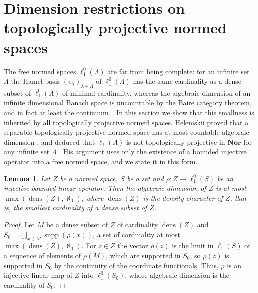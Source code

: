 \documentclass[12pt]{article}
\newtheorem{lemma}[theorem]{Lemma}
\newcommand{\Nor}{\mathbf{Nor}}
\newcommand{\lo}[1]{\ell_1^0(#1)}
\newcommand{\ellone}[1]{\ell_1(#1)}
\newcommand{\supp}{\operatorname{supp}}
\begin{document}

\section{Dimension restrictions on topologically projective normed
  spaces}\label{SectionNecessaryConditions}

The free normed spaces $\lo{\Lambda}$ are far from being complete: for an
infinite set $\Lambda$ the Hamel basis ${(e_\lambda)}_{\lambda\in\Lambda}$ of
$\lo{\Lambda}$ has the same cardinality as a dense subset of $\lo{\Lambda}$
of minimal cardinality, whereas the algebraic dimension of an infinite
dimensional Banach space is uncountable by the Baire category theorem, and in
fact at least the continuum~\cite{LowigDimLinRaume}. In this section we show that
this smallness is inherited by all topologically projective normed spaces.
Helemskii proved that a separable topologically projective normed space has at
most countable algebraic dimension \cite[proposition 2.4]{HelExtrProjSeqAlg},
and deduced that $\ellone{\Lambda}$ is not topologically projective in $\Nor$
for any infinite set $\Lambda$ \cite[proposition 2.5]{HelExtrProjSeqAlg}. His
argument uses only the existence of a bounded injective operator into a free
normed space, and we state it in this form.

\begin{lemma}\label{InjectionDimension} Let $Z$ be a normed space, $S$ be a
    set and $\rho:Z\to\lo{S}$ be an injective bounded linear operator. Then
    the algebraic dimension of $Z$ is at most $\max(\operatorname{dens}(Z),\aleph_0)$,
    where $\operatorname{dens}(Z)$ is the density character of $Z$, that is,
    the smallest cardinality of a dense subset of $Z$.
\end{lemma}
\begin{proof} Let $M$ be a dense subset of $Z$ of cardinality
    $\operatorname{dens}(Z)$ and $S_0=\bigcup_{x\in M}\supp(\rho(x))$, a set
    of cardinality at most $\max(\operatorname{dens}(Z),\aleph_0)$. For
    $z\in Z$ the vector $\rho(z)$ is the limit in $\ellone{S}$ of a sequence
    of elements of $\rho(M)$, which are supported in $S_0$, so $\rho(z)$ is
    supported in $S_0$ by the continuity of the coordinate functionals. Thus,
    $\rho$ is an injective linear map of $Z$ into $\lo{S_0}$, whose algebraic
    dimension is the cardinality of $S_0$.
\end{proof}
\end{document}
